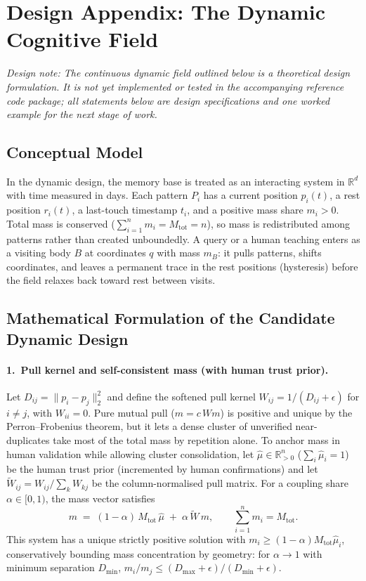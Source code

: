 \documentclass[11pt]{article}
\theoremstyle{remark}
\newcommand{\R}{\mathbb{R}}
\begin{document}
\section{Design Appendix: The Dynamic Cognitive Field}
\label{sec:dynamic_field}

\emph{Design note: The continuous dynamic field outlined below is a theoretical design formulation. It is not yet implemented or tested in the accompanying reference code package; all statements below are design specifications and one worked example for the next stage of work.}

\subsection{Conceptual Model}
In the dynamic design, the memory base is treated as an interacting system in $\R^d$ with time measured in days. Each pattern $P_i$ has a current position $p_i(t)$, a rest position $r_i(t)$, a last-touch timestamp $t_i$, and a positive mass share $m_i > 0$. Total mass is conserved ($\sum_{i=1}^n m_i = M_{\text{tot}} = n$), so mass is redistributed among patterns rather than created unboundedly. A query or a human teaching enters as a visiting body $B$ at coordinates $q$ with mass $m_B$: it pulls patterns, shifts coordinates, and leaves a permanent trace in the rest positions (hysteresis) before the field relaxes back toward rest between visits.

\subsection{Mathematical Formulation of the Candidate Dynamic Design}

\paragraph{1.\ Pull kernel and self-consistent mass (with human trust prior).}
Let $D_{ij} = \|p_i - p_j\|_2^2$ and define the softened pull kernel $W_{ij} = 1/(D_{ij} + \epsilon)$ for $i\neq j$, with $W_{ii}=0$. Pure mutual pull ($m = c\,W m$) is positive and unique by the Perron--Frobenius theorem, but it lets a dense cluster of unverified near-duplicates take most of the total mass by repetition alone. To anchor mass in human validation while allowing cluster consolidation, let $\hat{\mu}\in\R^n_{>0}$ ($\sum_i \hat{\mu}_i = 1$) be the human trust prior (incremented by human confirmations) and let $\tilde{W}_{ij} = W_{ij}/\sum_k W_{kj}$ be the column-normalised pull matrix. For a coupling share $\alpha\in[0,1)$, the mass vector satisfies
\begin{equation}
\label{eq:dyn_mass}
m \;=\; (1-\alpha)\,M_{\text{tot}}\,\hat{\mu} \;+\; \alpha\,\tilde{W}\,m, \qquad \sum_{i=1}^n m_i = M_{\text{tot}}.
\end{equation}
This system has a unique strictly positive solution with $m_i \ge (1-\alpha)M_{\text{tot}}\hat{\mu}_i$, conservatively bounding mass concentration by geometry: for $\alpha\to 1$ with minimum separation $D_{\min}$, $m_i/m_j \le (D_{\max}+\epsilon)/(D_{\min}+\epsilon)$.
\end{document}
